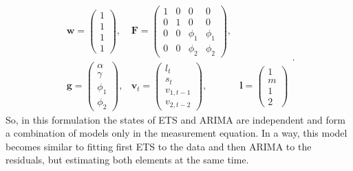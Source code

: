 \documentclass[
]{book}
\theoremstyle{definition}
\theoremstyle{definition}
\theoremstyle{definition}
\theoremstyle{definition}
\theoremstyle{remark}
\begin{document}
\begin{equation}
  \begin{aligned}
    \mathbf{w} = \begin{pmatrix} 1 \\ 1 \\ 1 \\ 1 \end{pmatrix}, & \mathbf{F} = \begin{pmatrix} 1 & 0 & 0 & 0 \\ 0 & 1 & 0 & 0 \\ 0 & 0 & \phi_1 & \phi_1 \\ 0 & 0 & \phi_2 & \phi_2 \end{pmatrix}, \\
    \mathbf{g} = \begin{pmatrix} \alpha \\ \gamma \\ \phi_1 \\ \phi_2 \end{pmatrix}, & \mathbf{v}_{t} = \begin{pmatrix} l_t \\ s_t \\ v_{1,t-1} \\ v_{2,t-2} \end{pmatrix}, & \boldsymbol{l} = \begin{pmatrix} 1 \\ m \\ 1 \\ 2\end{pmatrix}
  \end{aligned}.
  \label{eq:ADAMETSARIMAANN100Matrices}
\end{equation}
So, in this formulation the states of ETS and ARIMA are independent and form a combination of models only in the measurement equation. In a way, this model becomes similar to fitting first ETS to the data and then ARIMA to the residuals, but estimating both elements at the same time.
\end{document}
